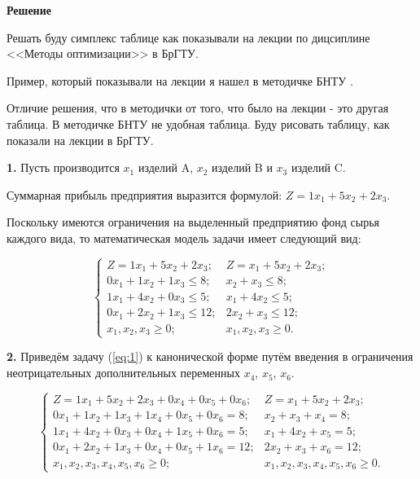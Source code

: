 \begin{center}
  \textbf{Решение}
\end{center}

Решать буду симплекс таблице как показывали на лекции по дицсиплине <<Методы оптимизации>> в БрГТУ.

Пример, который показывали на лекции я нашел в методичке БНТУ \cite{MethodBntu}.

Отличие решения, что в методички от того, что было на лекции - это другая таблица.
В методичке БНТУ не удобная таблица.
Буду рисовать таблицу, как показали на лекции в БрГТУ.

\newpage

\textbf{1.}
Пусть производится $x_1$ изделий A, $x_2$ изделий B и $x_3$ изделий C.

Суммарная прибыль предприятия выразится формулой: $Z=1 x_1 + 5 x_2 + 2 x_3$.

Поскольку имеются ограничения на выделенный предприятию фонд сырья каждого вида,
то математическая модель задачи имеет следующий вид:

\begin{equation}\label{eq:1}
  \begin{cases}
    Z = 1 x_1 + 5 x_2 + 2 x_3;    & Z = x_1 + 5 x_2 + 2 x_3; \\
    0 x_1 + 1 x_2 + 1 x_3 \leq 8; & x_2 + x_3 \leq 8; \\
    1 x_1 + 4 x_2 + 0 x_3 \leq 5; & x_1 + 4 x_2 \leq 5; \\
    0 x_1 + 2 x_2 + 1 x_3 \leq 12;& 2 x_2 + x_3 \leq 12; \\
    x_1, x_2, x_3 \geq 0;         & x_1, x_2, x_3 \geq 0. 
  \end{cases}
\end{equation}

\textbf{2.}
Приведём задачу (\ref{eq:1}) к канонической форме путём введения в ограничения
неотрицательных дополнительных переменных $x_4$, $x_5$, $x_6$.

\begin{equation}\label{eq:2}
  \begin{cases}
    Z = 1 x_1 + 5 x_2 + 2 x_3 + 0 x_4 + 0 x_5 + 0 x_6;  & Z = x_1 + 5 x_2 + 2 x_3; \\
    0 x_1 + 1 x_2 + 1 x_3 + 1 x_4 + 0 x_5 + 0 x_6 = 8;  & x_2 + x_3 + x_4 = 8; \\
    1 x_1 + 4 x_2 + 0 x_3 + 0 x_4 + 1 x_5 + 0 x_6 = 5;  & x_1 + 4 x_2 + x_5 = 5; \\
    0 x_1 + 2 x_2 + 1 x_3 + 0 x_4 + 0 x_5 + 1 x_6 = 12; & 2 x_2 + x_3 + x_6 = 12; \\
    x_1, x_2, x_3, x_4, x_5, x_6 \geq 0;                & x_1, x_2, x_3, x_4, x_5, x_6 \geq 0. 
  \end{cases}
\end{equation}

